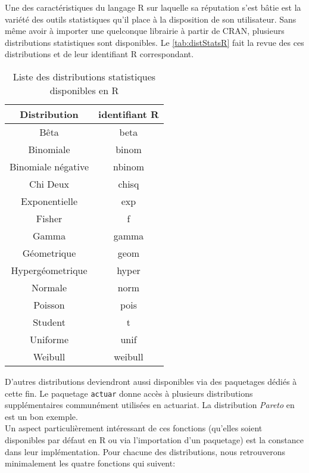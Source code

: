 Une des caractéristiques du langage R sur laquelle sa réputation s'est bâtie est la variété des outils statistiques qu'il place à la disposition de son utilisateur. Sans même avoir à importer une quelconque librairie à partir de CRAN, plusieurs distributions statistiques sont disponibles. Le \autoref{tab:distStatsR} fait la revue des ces distributions et de leur identifiant R correspondant. \cite{distStatsR} \\

\begin{table}[h]
	\centering
	\begin{tabular}{cc}
		\textbf{Distribution} & \textbf{identifiant R} \\
		\hline
		Bêta & beta \\
		Binomiale & binom \\
		Binomiale négative & nbinom \\
		Chi Deux & chisq \\
		Exponentielle & exp \\
		Fisher & f \\
		Gamma & gamma \\
		Géometrique & geom \\
		Hypergéometrique & hyper \\
		Normale & norm \\
		Poisson & pois \\
		Student & t \\
		Uniforme & unif \\
		Weibull & weibull	
	\end{tabular}
	\caption{Liste des distributions statistiques disponibles en R}
\end{table}
\label{tab:distStatsR}

D'autres distributions deviendront aussi disponibles via des paquetages dédiés à cette fin. Le paquetage \texttt{actuar} \cite{pkgR:actuar} donne accès à plusieurs distributions supplémentaires communément utilisées en actuariat. La distribution \emph{Pareto} en est un bon exemple. \\

Un aspect particulièrement intéressant de ces fonctions (qu'elles soient disponibles par défaut en R ou via l'importation d'un paquetage) est la constance dans leur implémentation. Pour chacune des distributions, nous retrouverons minimalement les quatre fonctions qui suivent: \\

